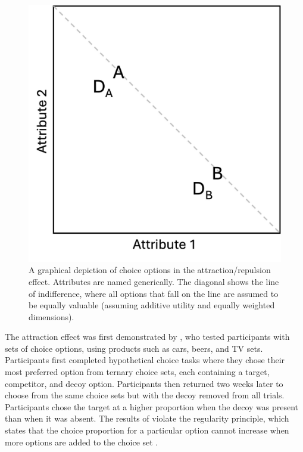 \begin{figure}
   \includegraphics[width=\linewidth]{figures/att_stim.jpg}
   \caption{A graphical depiction of choice options in the attraction/repulsion effect. Attributes are named generically. The diagonal shows the line of indifference, where all options that fall on the line are assumed to be equally valuable (assuming additive utility and equally weighted dimensions).}
   \label{fig:att_stim}
\end{figure}

The attraction effect was first demonstrated by \textcite{huberAddingAsymmetricallyDominated1982d}, who tested participants with sets of choice options, using products such as cars, beers, and TV sets. Participants first completed hypothetical choice tasks where they chose their most preferred option from ternary choice sets, each containing a target, competitor, and decoy option. Participants then returned two weeks later to choose from the same choice sets but with the decoy removed from all trials. Participants chose the target at a higher proportion when the decoy was present than when it was absent. The results of \textcite{huberAddingAsymmetricallyDominated1982d} violate the regularity principle, which states that the choice proportion for a particular option cannot increase when more options are added to the choice set \parencite{mackay1995probabilistic,marley1989random}.

